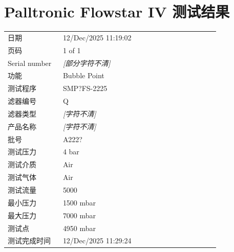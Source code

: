 \documentclass[UTF8,10pt,a4paper,fontset=fandol]{ctexart}
\newcommand{\fieldvalue}[1]{#1}
\begin{document}
\section{Palltronic Flowstar IV 测试结果}

\begin{tabular}{@{}p{0.24\linewidth}p{0.68\linewidth}@{}}
日期 &
\fieldvalue{12/Dec/2025 11:19:02}
\\
页码 &
\fieldvalue{1 of 1}
\\
Serial number &
\fieldvalue{\textit{[部分字符不清]}}
\\
功能 &
\fieldvalue{Bubble Point}
\\
测试程序 &
\fieldvalue{SMP?FS-2225}
\\
滤器编号 &
\fieldvalue{Q}
\\
滤器类型 &
\fieldvalue{\textit{[字符不清]}}
\\
产品名称 &
\fieldvalue{\textit{[字符不清]}}
\\
批号 &
\fieldvalue{A222?}
\\
测试压力 &
\fieldvalue{4 bar}
\\
测试介质 &
\fieldvalue{Air}
\\
测试气体 &
\fieldvalue{Air}
\\
测试流量 &
\fieldvalue{5000}
\\
最小压力 &
\fieldvalue{1500 mbar}
\\
最大压力 &
\fieldvalue{7000 mbar}
\\
测试点 &
\fieldvalue{4950 mbar}
\\
测试完成时间 &
\fieldvalue{12/Dec/2025 11:29:24}
\\
\end{tabular}
\end{document}
